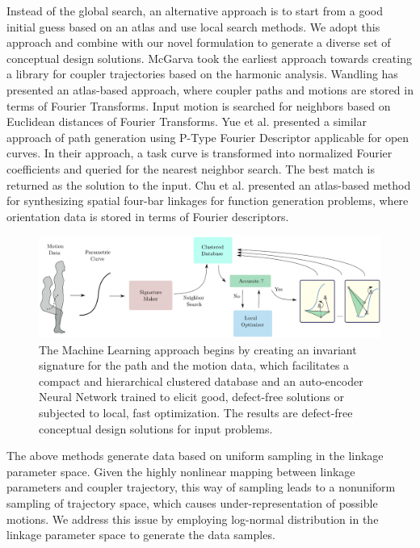 Instead of the global search, an alternative approach is to start from a good initial guess based on an atlas and use local search methods.
We adopt this approach and combine with our novel formulation to generate a diverse set of conceptual design solutions.
McGarva\cite{mcgarva1994} took the earliest approach towards creating a library for coupler trajectories based on the harmonic analysis.
Wandling\cite{wandling2000} has presented an atlas-based approach, where coupler paths and motions are stored in terms of Fourier Transforms.
Input motion is searched for neighbors based on Euclidean distances of Fourier Transforms.
Yue et al.\cite{yue-pathgen2011} presented a similar approach of path generation using P-Type Fourier Descriptor applicable for open curves.
In their approach, a task curve is transformed into normalized Fourier coefficients and queried for the nearest neighbor search.
The best match is returned as the solution to the input.
Chu et al.\cite{chu2010} presented an atlas-based method for synthesizing spatial four-bar linkages for function generation problems, where orientation data is stored in terms of Fourier descriptors.
\begin{figure}
\centering
\includegraphics[width=\textwidth]{jcise-18/figure/overall_approach.eps}
  \caption{The Machine Learning approach begins by creating an invariant signature for the path and the motion data, which facilitates a compact and hierarchical clustered database and an auto-encoder Neural Network trained to elicit good, defect-free solutions or subjected to local, fast optimization. The results are defect-free conceptual design solutions for input problems.}
\label{overallMethod}
\end{figure}
The above methods generate data based on uniform sampling in the linkage parameter space.
Given the highly nonlinear mapping between linkage parameters and coupler trajectory, this way of sampling leads to a nonuniform sampling of trajectory space, which causes under-representation of possible motions.
We address this issue by employing log-normal distribution in the linkage parameter space to generate the data samples.
